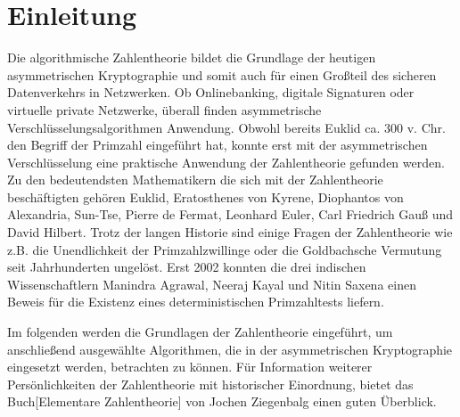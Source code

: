 \section{Einleitung}
	Die algorithmische Zahlentheorie bildet die Grundlage der heutigen asymmetrischen Kryptographie und somit auch für einen Großteil des sicheren Datenverkehrs in Netzwerken. Ob Onlinebanking, digitale Signaturen oder virtuelle private Netzwerke, überall finden asymmetrische Verschlüsselungsalgorithmen Anwendung. Obwohl bereits Euklid ca. 300 v. Chr. den Begriff der Primzahl eingeführt hat, konnte erst mit der asymmetrischen Verschlüsselung eine praktische Anwendung der Zahlentheorie gefunden werden. Zu den bedeutendsten Mathematikern die sich mit der Zahlentheorie beschäftigten gehören Euklid, Eratosthenes von Kyrene, Diophantos von Alexandria, Sun-Tse, Pierre de Fermat, Leonhard Euler, Carl Friedrich Gauß und David Hilbert. Trotz der langen Historie sind einige Fragen der Zahlentheorie wie z.B. die Unendlichkeit der Primzahlzwillinge oder die Goldbachsche Vermutung seit Jahrhunderten ungelöst. Erst 2002
	konnten die drei indischen Wissenschaftlern Manindra Agrawal, Neeraj Kayal und Nitin Saxena einen Beweis für die Existenz eines deterministischen Primzahltests liefern.
	
	Im folgenden werden die Grundlagen der Zahlentheorie eingeführt, um anschließend ausgewählte Algorithmen, die in der asymmetrischen Kryptographie eingesetzt werden, betrachten zu können. Für Information weiterer Persönlichkeiten der Zahlentheorie mit historischer Einordnung, bietet das Buch[Elementare Zahlentheorie] von Jochen Ziegenbalg einen guten Überblick.
	
	 